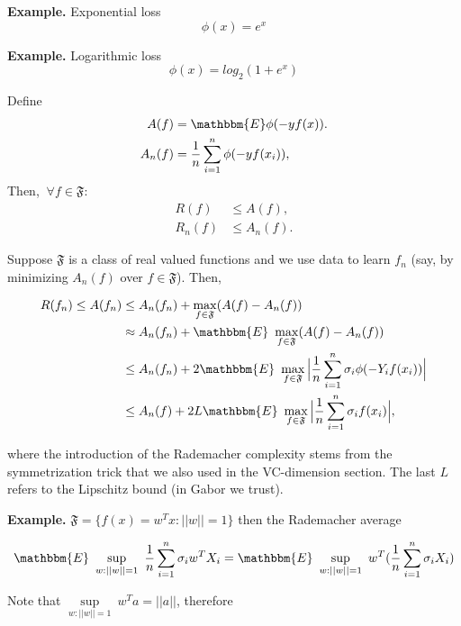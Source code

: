 \documentclass[11pt, english]{article}
\begin{document}
\textbf{Example.} Exponential loss\\
\begin{equation} 
\phi(x) = e^x
\end{equation}

\textbf{Example.} Logarithmic loss\\
\begin{equation} 
\phi(x) = log_2(1+e^x)
\end{equation}

 
Define 
\begin{align} 
A(f) &= \mathbbm{E}\phi(-yf(x)).\\
A_n(f) &= \frac{1}{n}\sum_{i=1}^n \phi(-yf(x_i)),
\end{align}
Then, $\ \forall f \in \mathfrak{F}$:
\begin{align}
R(f) &\leq A(f),\\
R_n(f) &\leq A_n(f).
\end{align}
 
Suppose $\mathfrak{F}$ is a class of real valued functions and we use data to learn $f_n$ (say, by minimizing $A_n(f)$ over $f \in \mathfrak{F}$). Then,
 
\begin{align}
	 R(f_n)\leq A(f_n) &\leq A_n(f_n) + \max_{f \in \mathfrak{F}}(A(f) - A_n(f))\\
	 & \approx A_n(f_n) + \mathbbm{E}\ \max_{f \in \mathfrak{F}}(A(f) - A_n(f))\\
	 & \leq A_n(f_n) + 2 \mathbbm{E}\ \max_{f \in \mathfrak{F}} \Big|\frac{1}{n} \sum_{i=1}^{n}\sigma_i \phi(-Y_i f(x_i))\Big|\\ 
	 & \leq A_n(f) + 2L \mathbbm{E}\ \max_{f \in \mathfrak{F}} \Big|\frac{1}{n} \sum_{i=1}^{n}\sigma_i f(x_i)\Big|,
\end{align} 

where the introduction of the Rademacher complexity stems from the symmetrization trick that we also used in the VC-dimension section. The last $L$ refers to the Lipschitz bound (in Gabor we trust).
 
\textbf{Example.} $\mathfrak{F} = \{f(x) = w^Tx : ||w|| = 1\}$ then the Rademacher average
 
\begin{equation}
\mathbbm{E}\ \sup\limits_{w:||w||=1} \ \frac{1}{n} \sum_{i=1}^n \sigma_i w^T X_i = \mathbbm{E}\ \sup\limits_{w:||w||=1} \ w^T(\frac{1}{n} \sum_{i=1}^{n} \sigma_i X_i)
\end{equation}
 
Note that $\sup\limits_{w:||w||=1} \ w^T a = ||a||$, therefore
 
\end{document}
